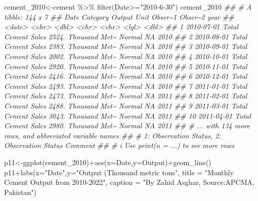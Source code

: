 \documentclass[
  letterpaper,
  DIV=11,
  numbers=noendperiod]{scrartcl}
\newenvironment{Shaded}{\begin{snugshade}}{\end{snugshade}}
\newcommand{\AttributeTok}[1]{\textcolor[rgb]{0.40,0.45,0.13}{#1}}
\newcommand{\DocumentationTok}[1]{\textcolor[rgb]{0.37,0.37,0.37}{\textit{#1}}}
\newcommand{\FunctionTok}[1]{\textcolor[rgb]{0.28,0.35,0.67}{#1}}
\newcommand{\NormalTok}[1]{\textcolor[rgb]{0.00,0.23,0.31}{#1}}
\newcommand{\OtherTok}[1]{\textcolor[rgb]{0.00,0.23,0.31}{#1}}
\newcommand{\SpecialCharTok}[1]{\textcolor[rgb]{0.37,0.37,0.37}{#1}}
\newcommand{\StringTok}[1]{\textcolor[rgb]{0.13,0.47,0.30}{#1}}
\begin{document}
\begin{Shaded}
\begin{Highlighting}[]
\NormalTok{cement\_2010}\OtherTok{\textless{}{-}}\NormalTok{cement }\SpecialCharTok{\%\textgreater{}\%} \FunctionTok{filter}\NormalTok{(Date}\SpecialCharTok{\textgreater{}=}\StringTok{"2010{-}6{-}30"}\NormalTok{)}
\NormalTok{cement\_2010}
\DocumentationTok{\#\# \# A tibble: 144 x 7}
\DocumentationTok{\#\#    Date       Category           Output Unit          Obser\textasciitilde{}1 Obser\textasciitilde{}2  year}
\DocumentationTok{\#\#    \textless{}date\textgreater{}     \textless{}chr\textgreater{}               \textless{}dbl\textgreater{} \textless{}chr\textgreater{}         \textless{}chr\textgreater{}   \textless{}lgl\textgreater{}   \textless{}dbl\textgreater{}}
\DocumentationTok{\#\#  1 2010{-}07{-}01 Total Cement Sales  2524. Thousand Met\textasciitilde{} Normal  NA       2010}
\DocumentationTok{\#\#  2 2010{-}08{-}01 Total Cement Sales  2383. Thousand Met\textasciitilde{} Normal  NA       2010}
\DocumentationTok{\#\#  3 2010{-}09{-}01 Total Cement Sales  2002. Thousand Met\textasciitilde{} Normal  NA       2010}
\DocumentationTok{\#\#  4 2010{-}10{-}01 Total Cement Sales  2920. Thousand Met\textasciitilde{} Normal  NA       2010}
\DocumentationTok{\#\#  5 2010{-}11{-}01 Total Cement Sales  2416. Thousand Met\textasciitilde{} Normal  NA       2010}
\DocumentationTok{\#\#  6 2010{-}12{-}01 Total Cement Sales  2493. Thousand Met\textasciitilde{} Normal  NA       2010}
\DocumentationTok{\#\#  7 2011{-}01{-}01 Total Cement Sales  2473. Thousand Met\textasciitilde{} Normal  NA       2011}
\DocumentationTok{\#\#  8 2011{-}02{-}01 Total Cement Sales  2488. Thousand Met\textasciitilde{} Normal  NA       2011}
\DocumentationTok{\#\#  9 2011{-}03{-}01 Total Cement Sales  3043. Thousand Met\textasciitilde{} Normal  NA       2011}
\DocumentationTok{\#\# 10 2011{-}04{-}01 Total Cement Sales  2980. Thousand Met\textasciitilde{} Normal  NA       2011}
\DocumentationTok{\#\# \# ... with 134 more rows, and abbreviated variable names}
\DocumentationTok{\#\# \#   1: \textasciigrave{}Observation Status\textasciigrave{}, 2: \textasciigrave{}Observation Status Comment\textasciigrave{}}
\DocumentationTok{\#\# \# i Use \textasciigrave{}print(n = ...)\textasciigrave{} to see more rows}
\end{Highlighting}
\end{Shaded}

\begin{Shaded}
\begin{Highlighting}[]
\NormalTok{p11}\OtherTok{\textless{}{-}}\FunctionTok{ggplot}\NormalTok{(cement\_2010)}\SpecialCharTok{+}\FunctionTok{aes}\NormalTok{(}\AttributeTok{x=}\NormalTok{Date,}\AttributeTok{y=}\NormalTok{Output)}\SpecialCharTok{+}\FunctionTok{geom\_line}\NormalTok{()}
\NormalTok{p11}\SpecialCharTok{+}\FunctionTok{labs}\NormalTok{(}\AttributeTok{x=}\StringTok{"Date"}\NormalTok{,}\AttributeTok{y=}\StringTok{"Output (Thousand metric tons"}\NormalTok{, }\AttributeTok{title =} \StringTok{"Monthly Cement Output from 2010{-}2022"}\NormalTok{, }\AttributeTok{caption =} \StringTok{"By Zahid Asghar, Source:APCMA, Pakistan"}\NormalTok{)}
\end{Highlighting}
\end{Shaded}
\end{document}
